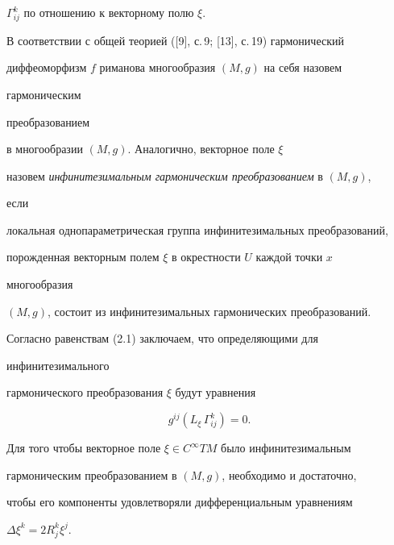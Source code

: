 $\Gamma^k_{ij}$ по отношению к векторному полю $\xi$. 


 


В соответствии с общей теорией ([9], с.\,9; [13], с.\,19) гармонический 


диффеоморфизм $f$ риманова многообразия $(M,g)$ на себя назовем {\it 


гармоническим 


преобразованием} в многообразии $(M,g)$. Аналогично, векторное поле $\xi$ 


назовем {\it инфинитезимальным гармоническим преобразованием} в $(M,g)$, 


если 


локальная однопараметрическая группа инфинитезимальных преобразований, 


порожденная векторным полем $\xi$ в окрестности $U$ каждой точки $x$ 


многообразия 


$(M,g)$, состоит из инфинитезимальных гармонических преобразований. 


 


Согласно равенствам (2.1) заключаем, что определяющими для 


инфинитезимального 


гармонического преобразования $\xi$ будут уравнения 


\begin{equation} 


g^{ij}(L_\xi\,\Gamma^k_{ij})=0. 


\end{equation} 


 


\begin{thms} 


Для того чтобы векторное поле $\xi\in C^\infty TM$ было инфинитезимальным 


гармоническим преобразованием в $(M,g)$, необходимо и достаточно, 


чтобы его компоненты удовлетворяли дифференциальным уравнениям 


$\Delta\xi^k=2R^k_j\xi^j$. 


\end{thms} 


 


